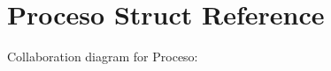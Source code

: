 \hypertarget{structProceso}{}\section{Proceso Struct Reference}
\label{structProceso}


Collaboration diagram for Proceso\+:
